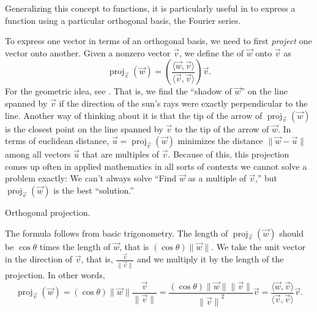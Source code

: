 \documentclass{ximera}
\begin{document}
Generalizing this concept to functions, it is particularly useful in  to express a function using a particular orthogonal basis, the Fourier series.

To express one vector in terms of an orthogonal basis, we need to first \emph{project} one vector onto another. Given a nonzero vector $\vec{v}$, we define the \emph{} of $\vec{w}$ onto $\vec{v}$ as
\begin{equation*}
    \operatorname{proj}_{\vec{v}}(\vec{w})
    = \left(
        \frac{\langle \vec{w} , \vec{v} \rangle}{ \langle \vec{v} , \vec{v} \rangle}
    \right) \vec{v} .
\end{equation*}
For the geometric idea, see .  That is, we find the ``shadow of $\vec{w}$'' on the line spanned by $\vec{v}$ if the direction of the sun's rays were exactly perpendicular to the line. Another way of thinking about it is that the tip of the arrow of $\operatorname{proj}_{\vec{v}}(\vec{w})$ is the closest point on the line spanned by $\vec{v}$ to the tip of the arrow of $\vec{w}$. In terms of euclidean distance, $\vec{u} = \operatorname{proj}_{\vec{v}}(\vec{w})$ minimizes the distance $\lVert \vec{w} - \vec{u} \rVert$ among all vectors $\vec{u}$ that are multiples of $\vec{v}$. Because of this, this projection comes up often in applied mathematics in all sorts of contexts we cannot solve a problem exactly: We can't always solve ``Find $\vec{w}$ as a multiple of $\vec{v}$,'' but $\operatorname{proj}_{\vec{v}}(\vec{w})$ is the best ``solution.''

\begin{myfig}
    \capstart
    
    \caption{Orthogonal projection.\label{vec-orthoproj:fig}}
\end{myfig}

The formula follows from basic trigonometry.  The length of $\operatorname{proj}_{\vec{v}}(\vec{w})$ should be $\cos \theta$ times the length of $\vec{w}$, that is $(\cos \theta)\lVert\vec{w}\rVert$. We take the unit vector in the direction of $\vec{v}$, that is, $\frac{\vec{v}}{\lVert \vec{v} \rVert}$ and we multiply it by the length of the projection.  In other words,
\begin{equation*}
    \operatorname{proj}_{\vec{v}}(\vec{w})
    =(\cos \theta) \lVert \vec{w} \rVert\frac{\vec{v}}{\lVert \vec{v} \rVert}
    =\frac{(\cos \theta) \lVert \vec{w} \rVert \lVert \vec{v} \rVert}{{\lVert \vec{v} \rVert}^2}\vec{v}
    =\frac{\langle \vec{w}, \vec{v} \rangle}{\langle \vec{v}, \vec{v} \rangle}\vec{v} .
\end{equation*}
\end{document}
